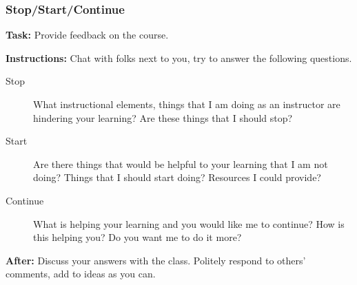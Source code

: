 \begin{frame}
  \frametitle{Stop/Start/Continue}

  \textbf{Task:} Provide feedback on the course.

  \vspace{0.5em}
  \textbf{Instructions:}
  Chat with folks next to you, try to answer the following questions.
  \begin{description}
  \item[Stop] What instructional elements, things that I am doing as an instructor are hindering your learning?
    Are these things that I should stop?
  \item[Start] Are there things that would be helpful to your learning that I am not doing?
    Things that I should start doing?
    Resources I could provide?
  \item[Continue] What is helping your learning and you would like me to continue?
    How is this helping you?
    Do you want me to do it more?
  \end{description}

  \vspace{0.5em}
  \textbf{After:} Discuss your answers with the class.
  Politely respond to others' comments, add to ideas as you can.

\end{frame}
